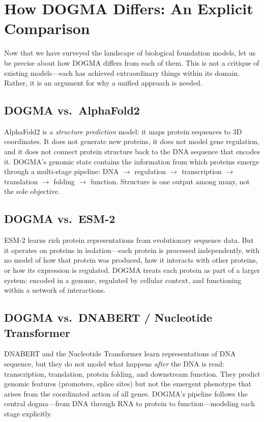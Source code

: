 \section{How DOGMA Differs: An Explicit Comparison}
\label{sec:dogma-comparison}

Now that we have surveyed the landscape of biological foundation models, let us be precise about how DOGMA differs from each of them. This is not a critique of existing models---each has achieved extraordinary things within its domain. Rather, it is an argument for why a unified approach is needed.

\subsection{DOGMA vs.\ AlphaFold2}

AlphaFold2 is a \emph{structure prediction} model: it maps protein sequences to 3D coordinates. It does not generate new proteins, it does not model gene regulation, and it does not connect protein structure back to the DNA sequence that encodes it. DOGMA's genomic state contains the information from which proteins emerge through a multi-stage pipeline: DNA $\to$ regulation $\to$ transcription $\to$ translation $\to$ folding $\to$ function. Structure is one output among many, not the sole objective.

\subsection{DOGMA vs.\ ESM-2}

ESM-2 learns rich protein representations from evolutionary sequence data. But it operates on proteins in isolation---each protein is processed independently, with no model of how that protein was produced, how it interacts with other proteins, or how its expression is regulated. DOGMA treats each protein as part of a larger system: encoded in a genome, regulated by cellular context, and functioning within a network of interactions.

\subsection{DOGMA vs.\ DNABERT / Nucleotide Transformer}

DNABERT and the Nucleotide Transformer learn representations of DNA sequence, but they do not model what happens \emph{after} the DNA is read: transcription, translation, protein folding, and downstream function. They predict genomic features (promoters, splice sites) but not the emergent phenotype that arises from the coordinated action of all genes. DOGMA's pipeline follows the central dogma---from DNA through RNA to protein to function---modeling each stage explicitly.

